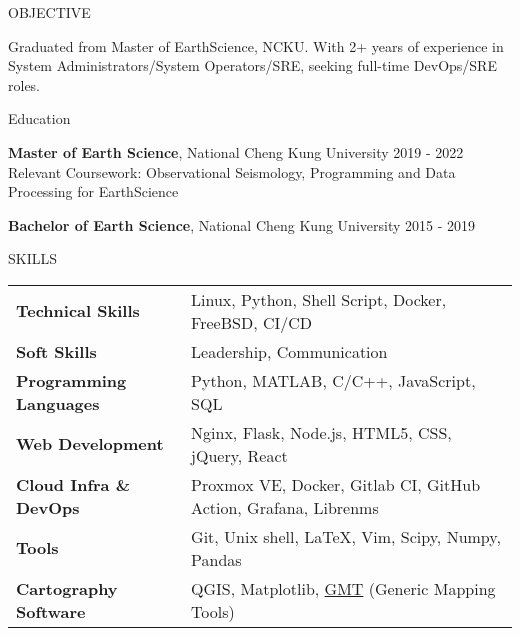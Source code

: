 \documentclass{resume} %
\begin{document}

\begin{rSection}{OBJECTIVE}

	{Graduated from Master of EarthScience, NCKU\@.  With 2+ years of experience in System Administrators/System Operators/SRE, seeking full-time DevOps/SRE roles.}


\end{rSection}

\begin{rSection}{Education}

{\bf Master of Earth Science}, National Cheng Kung University \hfill {2019 - 2022}\\
Relevant Coursework: Observational Seismology, Programming and Data Processing for EarthScience

{\bf Bachelor of Earth Science}, National Cheng Kung University \hfill {2015 - 2019}


\end{rSection}

\begin{rSection}{SKILLS}

\begin{tabular}{ @{} >{\bfseries}l @{\hspace{6ex}} l }
Technical Skills & Linux, Python, Shell Script, Docker, FreeBSD, CI/CD
\\
Soft Skills & Leadership, Communication\\
Programming Languages & Python, MATLAB, C/C++, JavaScript, SQL \\
Web Development & Nginx, Flask, Node.js, HTML5, CSS, jQuery, React\\
Cloud Infra \& DevOps & Proxmox VE, Docker, Gitlab CI, GitHub Action, Grafana, Librenms \\
Tools & Git, Unix shell, LaTeX, Vim, Scipy, Numpy, Pandas \\
Cartography Software & QGIS, Matplotlib, \href{https://www.generic-mapping-tools.org/}{GMT} (Generic Mapping Tools) \\
\end{tabular}\\
\end{rSection}
\end{document}
